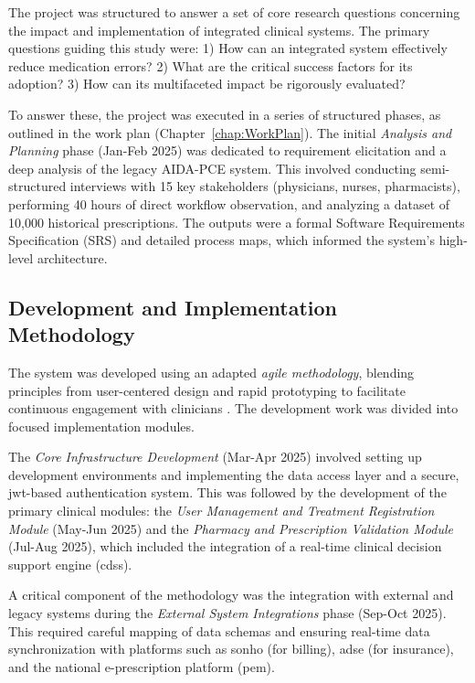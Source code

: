 The project was structured to answer a set of core research questions concerning the impact and implementation of integrated clinical systems. The primary questions guiding this study were: 1) How can an integrated system effectively reduce medication errors? 2) What are the critical success factors for its adoption? 3) How can its multifaceted impact be rigorously evaluated?

To answer these, the project was executed in a series of structured phases, as outlined in the work plan (Chapter~\ref{chap:WorkPlan}). The initial \textit{Analysis and Planning} phase (Jan-Feb 2025) was dedicated to requirement elicitation and a deep analysis of the legacy AIDA-PCE system. This involved conducting semi-structured interviews with 15 key stakeholders (physicians, nurses, pharmacists), performing 40 hours of direct workflow observation, and analyzing a dataset of 10,000 historical prescriptions. The outputs were a formal Software Requirements Specification (SRS) and detailed process maps, which informed the system's high-level architecture.

\subsection{Development and Implementation Methodology}

The system was developed using an adapted \textit{agile methodology}, blending principles from user-centered design and rapid prototyping to facilitate continuous engagement with clinicians \cite{fowler2018}. The development work was divided into focused implementation modules.

The \textit{Core Infrastructure Development} (Mar-Apr 2025) involved setting up development environments and implementing the data access layer and a secure, \gls{jwt}-based authentication system. This was followed by the development of the primary clinical modules: the \textit{User Management and Treatment Registration Module} (May-Jun 2025) and the \textit{Pharmacy and Prescription Validation Module} (Jul-Aug 2025), which included the integration of a real-time clinical decision support engine (\gls{cdss}).

A critical component of the methodology was the integration with external and legacy systems during the \textit{External System Integrations} phase (Sep-Oct 2025). This required careful mapping of data schemas and ensuring real-time data synchronization with platforms such as \gls{sonho} (for billing), \gls{adse} (for insurance), and the national e-prescription platform (\gls{pem}).

